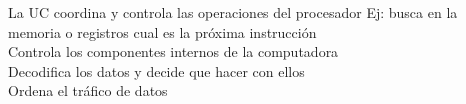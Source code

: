 \documentclass[preview]{standalone}
\begin{document}
La UC coordina y controla las operaciones del procesador
                            Ej: busca en la memoria o registros cual es la próxima instrucción\\Controla los componentes internos de la computadora\\Decodifica los datos y decide que hacer con ellos\\Ordena el tráfico de datos\\
\end{document}
